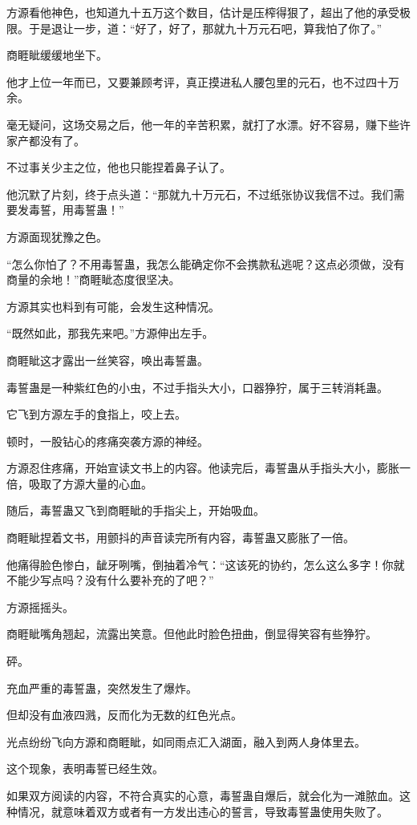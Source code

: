 \begin{this_body}
方源看他神色，也知道九十五万这个数目，估计是压榨得狠了，超出了他的承受极限。于是退让一步，道：“好了，好了，那就九十万元石吧，算我怕了你了。”

商睚眦缓缓地坐下。

他才上位一年而已，又要兼顾考评，真正摸进私人腰包里的元石，也不过四十万余。

毫无疑问，这场交易之后，他一年的辛苦积累，就打了水漂。好不容易，赚下些许家产都没有了。

不过事关少主之位，他也只能捏着鼻子认了。

他沉默了片刻，终于点头道：“那就九十万元石，不过纸张协议我信不过。我们需要发毒誓，用毒誓蛊！”

方源面现犹豫之色。

“怎么你怕了？不用毒誓蛊，我怎么能确定你不会携款私逃呢？这点必须做，没有商量的余地！”商睚眦态度很坚决。

方源其实也料到有可能，会发生这种情况。

“既然如此，那我先来吧。”方源伸出左手。

商睚眦这才露出一丝笑容，唤出毒誓蛊。

毒誓蛊是一种紫红色的小虫，不过手指头大小，口器狰狞，属于三转消耗蛊。

它飞到方源左手的食指上，咬上去。

顿时，一股钻心的疼痛突袭方源的神经。

方源忍住疼痛，开始宣读文书上的内容。他读完后，毒誓蛊从手指头大小，膨胀一倍，吸取了方源大量的心血。

随后，毒誓蛊又飞到商睚眦的手指尖上，开始吸血。

商睚眦捏着文书，用颤抖的声音读完所有内容，毒誓蛊又膨胀了一倍。

他痛得脸色惨白，龇牙咧嘴，倒抽着冷气：“这该死的协约，怎么这么多字！你就不能少写点吗？没有什么要补充的了吧？”

方源摇摇头。

商睚眦嘴角翘起，流露出笑意。但他此时脸色扭曲，倒显得笑容有些狰狞。

砰。

充血严重的毒誓蛊，突然发生了爆炸。

但却没有血液四溅，反而化为无数的红色光点。

光点纷纷飞向方源和商睚眦，如同雨点汇入湖面，融入到两人身体里去。

这个现象，表明毒誓已经生效。

如果双方阅读的内容，不符合真实的心意，毒誓蛊自爆后，就会化为一滩脓血。这种情况，就意味着双方或者有一方发出违心的誓言，导致毒誓蛊使用失败了。


\end{this_body}

